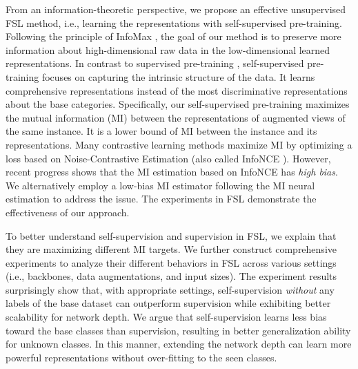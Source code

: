 \documentclass[runningheads]{llncs}
\begin{document}
From an information-theoretic perspective, we propose an effective unsupervised FSL method, i.e., learning the representations with self-supervised pre-training.
Following the principle of InfoMax \cite{linsker1988self}, the goal of our method is to preserve more information about high-dimensional raw data in the low-dimensional learned representations.
In contrast to supervised pre-training \cite{tian2020rethinking}, self-supervised pre-training focuses on capturing the intrinsic structure of the data.
It learns comprehensive representations instead of the most discriminative representations about the base categories.
Specifically, our self-supervised pre-training maximizes the mutual information (MI) between the representations of augmented views of the same instance. 
It is a lower bound of MI between the instance and its representations.
Many contrastive learning methods \cite{oord2018representation,chen2020a,he2020momentum} maximize MI by optimizing a loss based on Noise-Contrastive Estimation \cite{gutmann2010noise} (also called InfoNCE \cite{oord2018representation}).
However, recent progress \cite{poole2019on,song2020understanding,wen2020mutual} shows that the MI estimation based on InfoNCE has \emph{high bias}.
We alternatively employ a low-bias MI estimator following the MI neural estimation \cite{belghazi2018mutual} to address the issue.
The experiments in FSL demonstrate the effectiveness of our approach.

To better understand self-supervision and supervision in FSL, we explain that they are maximizing different MI targets. 
We further construct comprehensive experiments to analyze their different behaviors in FSL across various settings (i.e., backbones, data augmentations, and input sizes).
The experiment results surprisingly show that, with appropriate settings, self-supervision \textit{without} any labels of the base dataset can outperform supervision while exhibiting better scalability for network depth.
We argue that self-supervision learns less bias toward the base classes than supervision, resulting in better generalization ability for unknown classes.
In this manner, extending the network depth can learn more powerful representations without over-fitting to the seen classes.
\end{document}

